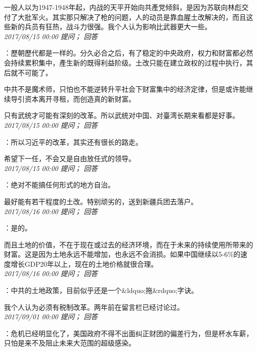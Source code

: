 \documentclass[twocolumn]{ctexart}
\begin{document}
一般人以为1947-1948年起，内战的天平开始向共產党倾斜，是因为苏联向林彪交付了大批军火。其实那只解决了枪的问题，人的动员是靠血腥土改解决的，而且这些新的兵员有狂热，战斗力很强。我个人认为影响比武器更大一些。\\

\textit{\hfill\noindent\small 2017/08/15 00:00 提问； 回答}

：歷朝歷代都是一样的。分久必合之后，有了稳定的中央政府，权力和财富都必然会持续累积集中，產生新的既得利益阶级。土改只能在建立政权的过程中执行，其后就不可能了。

中共不是魔术师，只怕也不能逆转升平社会下财富集中的经济定律，但是或许能继续导引资本离开寻租，而创造真的新财富。

只有武统才可能有深刻的改革。所以武统对中国、对臺湾长期来看都是好事。\\

\textit{\hfill\noindent\small 2017/08/15 00:00 提问； 回答}

：所以习近平的改革，其实还有很长的路走。

希望下一任，不会又是自由放任式的领导。\\

\textit{\hfill\noindent\small 2017/08/15 00:00 提问； 回答}

：绝对不能搞任何形式的地方自治。

最好能有若干程度的土改。特别顽劣的，送到新疆兵团去落户。\\

\textit{\hfill\noindent\small 2017/08/16 00:00 提问； 回答}

：是的。

而且土地的价值，不在于现在或过去的经济环境，而在于未来的持续使用所带来的财富。这是因为土地永远不能增加，也永远不会消损。如果中国继续以5-6\%的速度增长GDP20年以上，现在的土地价格就很合理。\\

\textit{\hfill\noindent\small 2017/08/16 00:00 提问； 回答}

：中共的土地政策，目前似乎还是一个\&ldquo;拖\&rdquo;字诀。

我个人认为必须有税制改革。两年前在留言栏已经讨论过。\\

\textit{\hfill\noindent\small 2017/09/01 00:00 提问； 回答}

：危机已经明显化了，美国政府不得不出面纠正财团的偏差行为，但是杯水车薪，只怕是来不及阻止未来大范围的超级感染。
\end{document}
